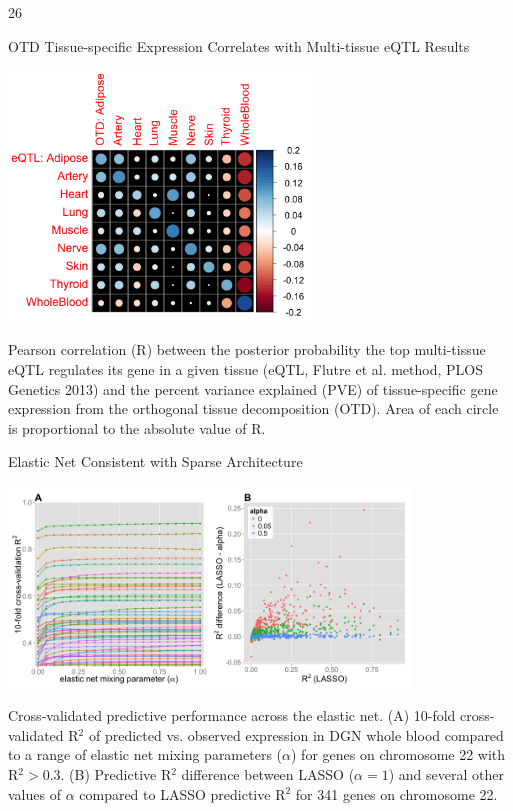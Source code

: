 \documentclass[final]{beamer}
\newcommand{\ColWidth}{26}
\begin{document}
\begin{frame}{}
\begin{textblock}{\ColWidth}
\begin{block}{OTD Tissue-specific Expression Correlates with Multi-tissue eQTL Results}
	\begin{center}
		\includegraphics[width=0.6\textwidth]{plots/Fig-cor-StephensPr-OTDtsPVE.png}
	\end{center}
	{\tiny Pearson correlation (R) between the posterior probability the top multi-tissue eQTL regulates its gene in a given tissue (eQTL, Flutre et al. method, PLOS Genetics 2013) and the percent variance explained (PVE) of tissue-specific gene expression from the orthogonal tissue decomposition (OTD). Area of each circle is proportional to the absolute value of R.\\}
\end{block}



\begin{block}{Elastic Net Consistent with Sparse Architecture}
	\begin{center}
		\includegraphics[width=0.8\textwidth]{plots/Fig3.png}
	 \end{center}
	 {\tiny Cross-validated predictive performance across the elastic net. (A) 10-fold cross-validated R$^2$ of predicted vs. observed expression in DGN whole blood compared to a range of elastic net mixing parameters ($\alpha$) for genes on chromosome 22 with R$^2 > 0.3$. (B) Predictive R$^2$  difference between LASSO ($\alpha=1$) and several other values of $\alpha$ compared to LASSO predictive R$^2$  for 341 genes on chromosome 22.\\}


\end{block}
\end{textblock}
\end{frame}
\end{document}
